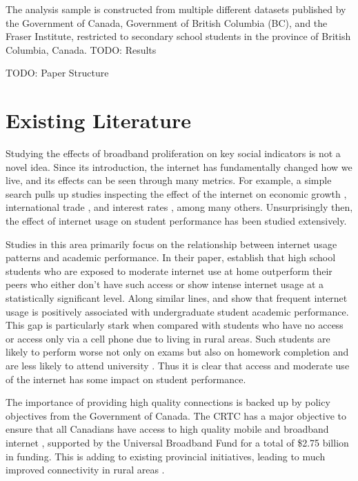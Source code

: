 \documentclass[stu, floatsintext]{apa7}
\begin{document}
    The analysis sample is constructed from multiple different datasets published by the Government of Canada, Government of British Columbia (BC), and the Fraser Institute, restricted to secondary school students in the province of British Columbia, Canada. TODO: Results

    TODO: Paper Structure
    \section{Existing Literature}
    Studying the effects of broadband proliferation on key social indicators is not a novel idea. Since its introduction, the internet has fundamentally changed how we live, and its effects can be seen through many metrics. For example, a simple search pulls up studies inspecting the effect of the internet on economic growth \autocite{CHOI200939}, international trade \autocite{Lin2015}, and interest rates \autocite{Luo2018}, among many others. Unsurprisingly then, the effect of internet usage on student performance has been studied extensively. 

    Studies in this area primarily focus on the relationship between internet usage patterns and academic performance. In their paper, \textcite{Austin2011} establish that high school students who are exposed to moderate internet use at home outperform their peers who either don't have such access or show intense internet usage at a statistically significant level. Along similar lines, \textcite{XU2019166} and \textcite{siraj2015internet} show that frequent internet usage is positively associated with undergraduate student academic performance. This gap is particularly stark when compared with students who have no access or access only via a cell phone due to living in rural areas. Such students are likely to perform worse not only on exams but also on homework completion and are less likely to attend university \textcite{hampton2020broadband}. Thus it is clear that access and moderate use of the internet has some impact on student performance. 
    
    The importance of providing high quality connections is backed up by policy objectives from the Government of Canada. The CRTC has a major objective to ensure that all Canadians have access to high quality mobile and broadband internet \autocite{radio2020broadband}, supported by the Universal Broadband Fund for a total of \$2.75 billion in funding. This is adding to existing provincial initiatives, leading to much improved connectivity in rural areas \autocite{rajabiun2013rural}.
\end{document}
